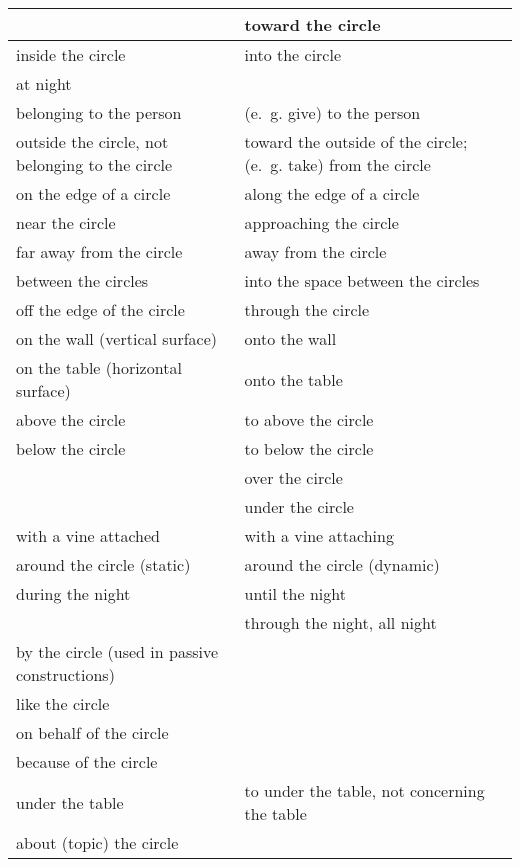 \documentclass{book}
\begin{document}
\begin{longtabu}[c]{|X|X|}
    &  toward the circle \\
    \hline
     inside the circle &  into the circle \\
     at night & \\
     belonging to the person &  (e.~g. give) to the person \\
     outside the circle, not belonging to the circle &  toward the outside of the circle; (e.~g. take) from the circle \\
     on the edge of a circle &  along the edge of a circle \\
     near the circle &  approaching the circle \\
     far away from the circle &  away from the circle \\
     between the circles &  into the space between the circles \\
     off the edge of the circle &  through the circle \\
     on the wall (vertical surface) &  onto the wall \\
     on the table (horizontal surface) &  onto the table \\
     above the circle &  to above the circle \\
     below the circle &  to below the circle \\
    &  over the circle \\
    &  under the circle \\
     with a vine attached &  with a vine attaching \\
     around the circle (static) &  around the circle (dynamic) \\
     during the night &  until the night \\
    &  through the night, all night \\
     by the circle (used in passive constructions) & \\
     like the circle & \\
     on behalf of the circle & \\
     because of the circle & \\
     under the table &  to under the table, not concerning the table \\
     about (topic) the circle & \\
\end{longtabu}
\end{document}
